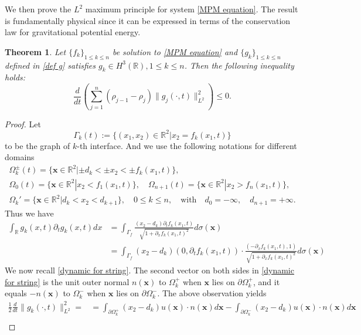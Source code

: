 \documentclass[11pt]{article}
\newcommand{\Om}{\Omega}
\newtheorem{theorem}{Theorem}[section]
\theoremstyle{definition}
\numberwithin{equation}{section}
\begin{document}
We then prove the $L^2$ maximum principle for system \eqref{MPM equation}. The result is fundamentally physical since it can be expressed in terms of the conservation law for gravitational potential energy.
 \begin{theorem}\label{energy conservation}
     Let $\{f_k\}_{1\leq k\leq n}$ be solution to \eqref{MPM equation} and $\{g_k\}_{1\leq k\leq n}$ defined in \eqref{def g} satisfies $g_k\in H^3(\mathbb{R}),1\leq k\leq n$. Then the following inequality holds:     \begin{equation}
         \frac{d}{dt}\left(\sum_{j=1}^n(\rho_{j-1}-\rho_j)\|g_j(\cdot,t)\|_{L^2}^2\right)\leq0.
     \end{equation}
 \end{theorem}
 \begin{proof}
     Let
     \begin{equation}
         \Gamma_k(t):=\{(x_1,x_2)\in\mathbb{R}^2|x_2=f_k(x_1,t)\}
     \end{equation}
     to be the graph of $k$-th interface. And we use the following notations for different domains
     \begin{gather}
         \Om_{k}^{\pm}(t)=\{\textbf{x}\in\mathbb{R}^2|\pm d_k<\pm x_2<\pm f_k(x_1,t)\},\\
         \Om_0(t)=\{\textbf{x}\in\mathbb{R}^2| x_2<f_1(x_1,t)\},\quad \Om_{n+1}(t)=\{\textbf{x}\in\mathbb{R}^2| x_2>f_n(x_1,t)\},\\
         \Om_k'=\{\textbf{x}\in\mathbb{R}^2| d_k<x_2<d_{k+1}\},\quad 0\leq k\leq n, \quad\text{with}\quad d_0=-\infty,\quad d_{n+1}=+\infty.
     \end{gather}
     Thus we have
     \begin{align}
         \int_{\mathbb{R}}g_k(x,t)\partial_tg_k(x,t)dx&=\int_{\Gamma_f}\frac{(x_2-d_k)\partial_tf_k(x_1,t)}{\sqrt{1+\partial_{x}f_k(x_1,t)^2
        }}d\sigma(\textbf{x})\\
        &=\int_{\Gamma_f}(x_2-d_k)(0,\partial_tf_k(x_1,t))\cdot\frac{(-\partial_xf_k(x_1,t),1)}{\sqrt{1+\partial_xf_k(x_1,t)^2
        }}d\sigma(\textbf{x})
     \end{align}
We now recall \eqref{dynamic for string}. The second vector on both sides in \eqref{dynamic for string} is the unit outer normal $n(\textbf{x})$ to $\Om_k^{+}$ when $\textbf{x}$ lies on $\partial\Om_k^{+}$, and it equals $-n(\textbf{x})$ to $\Om_k^{-}$ when $\textbf{x}$ lies on $\partial\Om_k^{-}$. The above observation yields
\begin{align}
    \frac{1}{2}\frac{d}{dt}\|g_k(\cdot,t)\|_{L^2}^2=&=\int_{\partial\Om_k^+}(x_2-d_k)u(\textbf{x})\cdot n(\textbf{x})d\textbf{x}-\int_{\partial\Om_k^-}(x_2-d_k)u(\textbf{x})\cdot n(\textbf{x})d\textbf{x} \\

\end{align}
\end{proof}
\end{document}
